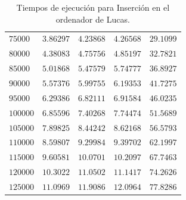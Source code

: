 \documentclass[12pt]{article}
\begin{document}
\begin{table}
\begin{tabular}{|l|l|l|l|l|}
            $75000$ & $3.86297$ & $4.23868$ & $4.26568$ & $29.1099$ \\
            $80000$ & $4.38083$ & $4.75756$ & $4.85197$ & $32.7821$ \\
            $85000$ & $5.01868$ & $5.47579$ & $5.74777$ & $36.8927$ \\
            $90000$ & $5.57376$ & $5.99755$ & $6.19353$ & $41.7275$ \\
            $95000$ & $6.29386$ & $6.82111$ & $6.91584$ & $46.0235$ \\
            $100000$ & $6.85596$ & $7.40268$ & $7.74474$ & $51.5689$ \\
            $105000$ & $7.89825$ & $8.44242$ & $8.62168$ & $56.5793$ \\
            $110000$ & $8.59807$ & $9.29984$ & $9.39702$ & $62.1997$ \\
            $115000$ & $9.60581$ & $10.0701$ & $10.2097$ & $67.7463$ \\
            $120000$ & $10.3022$ & $11.0502$ & $11.1417$ & $74.2626$ \\
            $125000$ & $11.0969$ & $11.9086$ & $12.0964$ & $77.8286$ \\
            \hline
        \end{tabular}
        \caption{Tiempos de ejecución para Inserción en el ordenador de Lucas.}
        \label{tab:Inserción_tiempos}
    \end{table}
\end{document}

